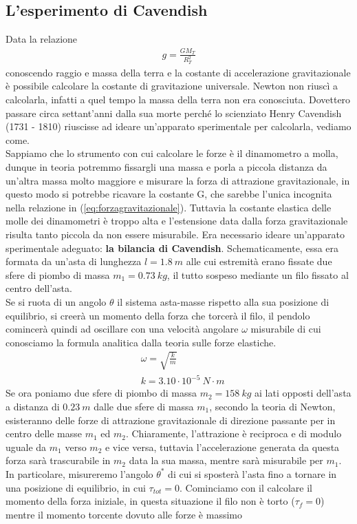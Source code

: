 \subsection{L'esperimento di Cavendish}
Data la relazione 
\begin{align*}
	g= \frac{G M_T}{R_T^2} 
\end{align*}
conoscendo raggio e massa della terra e la costante di accelerazione gravitazionale è possibile calcolare la costante di gravitazione universale. Newton non riuscì a calcolarla, infatti a quel tempo la massa della terra non era conosciuta. Dovettero passare circa settant'anni dalla sua morte perché lo scienziato Henry Cavendish (1731 - 1810) riuscisse ad ideare un'apparato sperimentale per calcolarla, vediamo come.\\
Sappiamo che lo strumento con cui calcolare le forze è il dinamometro a molla, dunque in teoria potremmo fissargli una massa e porla a piccola distanza da un'altra massa molto maggiore e misurare la forza di attrazione gravitazionale, in questo modo si potrebbe ricavare la costante G, che sarebbe l'unica incognita nella relazione in (\ref{eq:forzagravitazionale}). Tuttavia la costante elastica delle molle dei dinamometri è troppo alta e l'estensione data dalla forza gravitazionale risulta tanto piccola da non essere misurabile. Era necessario ideare un'apparato sperimentale adeguato: \textbf{la bilancia di Cavendish}. Schematicamente, essa era formata da un'asta di lunghezza $l = 1.8\ m$ alle cui estremità erano fissate due sfere di piombo di massa $m_1 = 0.73\ kg$, il tutto sospeso mediante un filo fissato al centro dell'asta.\\
Se si ruota di un angolo $\theta$ il sistema asta-masse rispetto alla sua posizione di equilibrio, si creerà un momento della forza che torcerà il filo, il pendolo comincerà quindi ad oscillare con una velocità angolare $\omega$ misurabile di cui conosciamo la formula analitica dalla teoria sulle forze elastiche. 
\begin{align*}
	&\omega = \sqrt{\frac{k}{m}}\\
	&k = 3.10 \cdot 10^{-5}\ N\cdot m
\end{align*}
Se ora poniamo  due sfere di piombo di massa $m_2 = 158\ kg$ ai lati opposti dell'asta a distanza di $0.23\ m$ dalle due sfere di massa $m_1$, secondo la teoria di Newton, esisteranno delle forze di attrazione gravitazionale di direzione passante per in centro delle masse $m_1$ ed $m_2$. Chiaramente, l'attrazione è reciproca e di modulo uguale da $m_1$ verso $m_2$ e vice versa, tuttavia l'accelerazione generata da questa forza sarà trascurabile in $m_2$ data la sua massa, mentre sarà misurabile per $m_1$. In particolare, misureremo l'angolo $\theta^*$ di cui si sposterà l'asta fino a tornare in una posizione di equilibrio, in cui $\tau_{tot} = 0$. Cominciamo con il calcolare il momento della forza iniziale, in questa situazione il filo non è torto ($\tau_f= 0$) mentre il momento torcente dovuto alle forze è massimo
